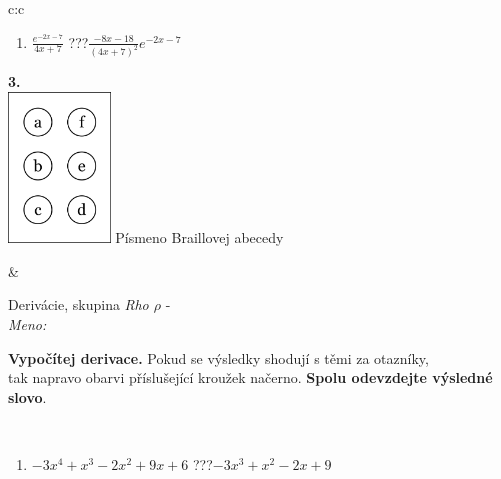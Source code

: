 \documentclass[10pt]{report}
\begin{document}
\begin{tabular}{c:c}
\begin{minipage}[c][104.5mm][t]{0.5\linewidth}
\begin{center}
\begin{minipage}{0.79\linewidth}
\begin{center}
\begin{varwidth}{\linewidth}
\begin{enumerate}
\item $\frac{e^{-2x-7}}{4x+7}$\quad \dotfill\; ???\;\dotfill \quad $\frac{-8x-18}{(4x+7)^2}e^{-2x-7}$
\end{enumerate}
\end{varwidth}
\end{center}
\end{minipage}
\begin{minipage}{0.20\linewidth}
\begin{center}
{\Huge\bfseries 3.} \\[2mm]
\includegraphics[height=40mm]{../images/braille.png}
{\small Písmeno Braillovej abecedy}
\end{center}
\end{minipage}
\end{center}
\end{minipage}
&
\begin{minipage}[c][104.5mm][t]{0.5\linewidth}
\begin{center}
\vspace{7mm}
{\huge Derivácie, skupina \textit{Rho $\rho$} -}\\[5mm]
\textit{Meno:}\phantom{xxxxxxxxxxxxxxxxxxxxxxxxxxxxxxxxxxxxxxxxxxxxxxxxxxxxxxxxxxxxxxxxx}\\[5mm]
\begin{minipage}{0.95\linewidth}
\begin{center}
\textbf{Vypočítej derivace.} Pokud se výsledky shodují s těmi za otazníky,\\tak napravo obarvi příslušející kroužek načerno. \textbf{Spolu odevzdejte výsledné slovo}.
\end{center}
\end{minipage}
\\[1mm]
\begin{minipage}{0.79\linewidth}
\begin{center}
\begin{varwidth}{\linewidth}
\begin{enumerate}
\normalsize
\item $-3x^4+x^3-2x^2+9x+6$\quad \dotfill\; ???\;\dotfill \quad $-3x^3+x^2-2x+9$

\end{enumerate}
\end{varwidth}
\end{center}
\end{minipage}
\end{center}
\end{minipage}
\end{tabular}
\end{document}
